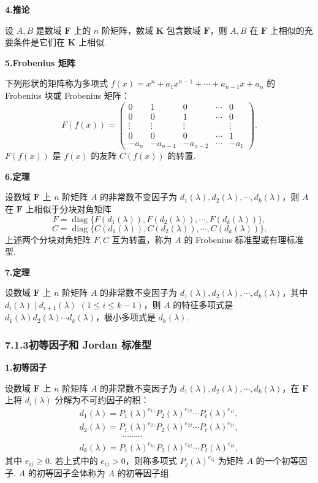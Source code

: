 \documentclass[UTF8, 12pt, fontset=fandol, oneside]{ctexart}
\begin{document}
\noindent\textbf{4.\quad 推论}

设 $A,B$ 是数域 $\mathbf{F}$ 上的 $n$ 阶矩阵，数域 $\mathbf{K}$ 包含数域 $\mathbf{F}$，则 $A,B$ 在 $\mathbf{F}$ 上相似的充要条件是它们在 $\mathbf{K}$ 上相似.

\noindent\textbf{5.\quad Frobenius 矩阵}

下列形状的矩阵称为多项式 $f(x)=x^n+a_1x^{n-1}+\cdots+a_{n-1}x+a_n$ 的 Frobenius 块或 Frobenius 矩阵：
\[
F(f(x))=
\left(\begin{array}{ccccc}
0 & 1 & 0 & \cdots & 0\\
0 & 0 & 1 & \cdots & 0\\
\vdots & \vdots & \vdots &        & \vdots\\
0 & 0 & 0 & \cdots & 1\\
-a_n & -a_{n-1} & -a_{n-2} & \cdots & -a_1
\end{array}\right).
\]
$F(f(x))$ 是 $f(x)$ 的友阵 $C(f(x))$ 的转置.

\noindent\textbf{6.\quad 定理}

设数域 $\mathbf{F}$ 上 $n$ 阶矩阵 $A$ 的非常数不变因子为 $d_1(\lambda),d_2(\lambda),\cdots,d_k(\lambda)$，则 $A$ 在 $\mathbf{F}$ 上相似于分块对角矩阵
\begin{equation}
F=\operatorname{diag}\{F(d_1(\lambda)),F(d_2(\lambda)),\cdots,F(d_k(\lambda))\},
\tag{7.3}
\end{equation}
\begin{equation}
C=\operatorname{diag}\{C(d_1(\lambda)),C(d_2(\lambda)),\cdots,C(d_k(\lambda))\}.
\tag{7.4}
\end{equation}
上述两个分块对角矩阵 $F,C$ 互为转置，称为 $A$ 的 Frobenius 标准型或有理标准型.

\noindent\textbf{7.\quad 定理}

设数域 $\mathbf{F}$ 上 $n$ 阶矩阵 $A$ 的非常数不变因子为 $d_1(\lambda),d_2(\lambda),\cdots,d_k(\lambda)$，其中 $d_i(\lambda)\mid d_{i+1}(\lambda)$ $(1\le i\le k-1)$，则 $A$ 的特征多项式是 $d_1(\lambda)d_2(\lambda)\cdots d_k(\lambda)$，极小多项式是 $d_k(\lambda)$.

\subsubsection*{7.1.3\quad 初等因子和 Jordan 标准型}

\noindent\textbf{1.\quad 初等因子}

设数域 $\mathbf{F}$ 上 $n$ 阶矩阵 $A$ 的非常数不变因子为 $d_1(\lambda),d_2(\lambda),\cdots,d_k(\lambda)$，在 $\mathbf{F}$ 上将 $d_i(\lambda)$ 分解为不可约因子的积：
\[
\begin{array}{l}
d_1(\lambda)=P_1(\lambda)^{e_{11}}P_2(\lambda)^{e_{12}}\cdots P_t(\lambda)^{e_{1t}},\\
d_2(\lambda)=P_1(\lambda)^{e_{21}}P_2(\lambda)^{e_{22}}\cdots P_t(\lambda)^{e_{2t}},\\
\hspace{5em}\cdots\cdots\cdots\\
d_k(\lambda)=P_1(\lambda)^{e_{k1}}P_2(\lambda)^{e_{k2}}\cdots P_t(\lambda)^{e_{kt}},
\end{array}
\]
其中 $e_{ij}\ge 0$. 若上式中的 $e_{ij}>0$，则称多项式 $P_j(\lambda)^{e_{ij}}$ 为矩阵 $A$ 的一个初等因子. $A$ 的初等因子全体称为 $A$ 的初等因子组.
\end{document}
